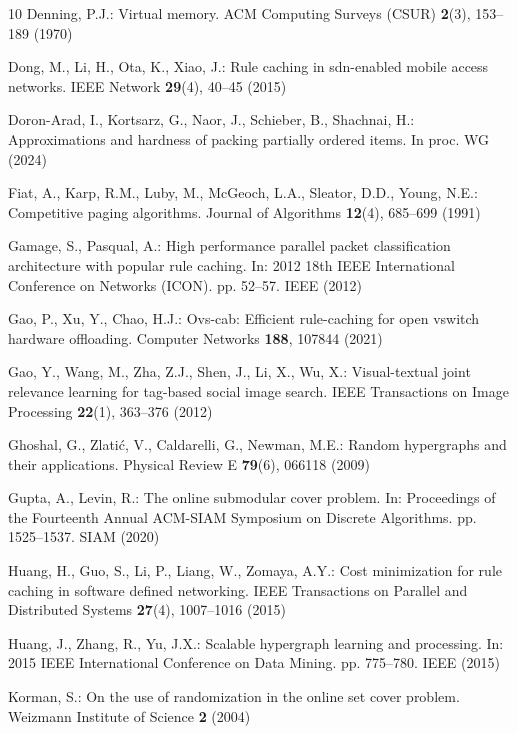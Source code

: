 \documentclass[11pt]{article}
\begin{document}
\begin{thebibliography}{10}
Denning, P.J.: Virtual memory. ACM Computing Surveys (CSUR)  \textbf{2}(3),
  153--189 (1970)

Dong, M., Li, H., Ota, K., Xiao, J.: Rule caching in sdn-enabled mobile access
  networks. IEEE Network  \textbf{29}(4),  40--45 (2015)

Doron-Arad, I., Kortsarz, G., Naor, J., Schieber, B., Shachnai, H.:
  Approximations and hardness of packing partially ordered items. In proc. WG
  (2024)

Fiat, A., Karp, R.M., Luby, M., McGeoch, L.A., Sleator, D.D., Young, N.E.:
  Competitive paging algorithms. Journal of Algorithms  \textbf{12}(4),
  685--699 (1991)

Gamage, S., Pasqual, A.: High performance parallel packet classification
  architecture with popular rule caching. In: 2012 18th IEEE International
  Conference on Networks (ICON). pp. 52--57. IEEE (2012)

Gao, P., Xu, Y., Chao, H.J.: Ovs-cab: Efficient rule-caching for open vswitch
  hardware offloading. Computer Networks  \textbf{188},  107844 (2021)

Gao, Y., Wang, M., Zha, Z.J., Shen, J., Li, X., Wu, X.: Visual-textual joint
  relevance learning for tag-based social image search. IEEE Transactions on
  Image Processing  \textbf{22}(1),  363--376 (2012)

Ghoshal, G., Zlati{\'c}, V., Caldarelli, G., Newman, M.E.: Random hypergraphs
  and their applications. Physical Review E  \textbf{79}(6),  066118 (2009)

Gupta, A., Levin, R.: The online submodular cover problem. In: Proceedings of
  the Fourteenth Annual ACM-SIAM Symposium on Discrete Algorithms. pp.
  1525--1537. SIAM (2020)

Huang, H., Guo, S., Li, P., Liang, W., Zomaya, A.Y.: Cost minimization for rule
  caching in software defined networking. IEEE Transactions on Parallel and
  Distributed Systems  \textbf{27}(4),  1007--1016 (2015)

Huang, J., Zhang, R., Yu, J.X.: Scalable hypergraph learning and processing.
  In: 2015 IEEE International Conference on Data Mining. pp. 775--780. IEEE
  (2015)

Korman, S.: On the use of randomization in the online set cover problem.
  Weizmann Institute of Science  \textbf{2} (2004)


\end{thebibliography}
\end{document}
